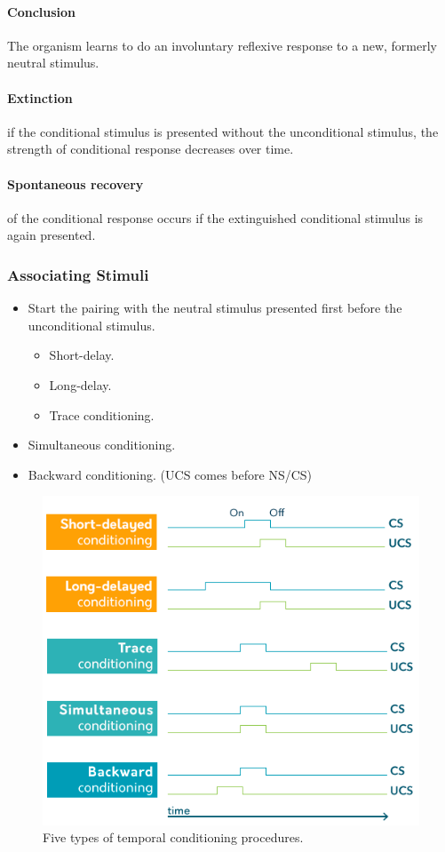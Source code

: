 \documentclass{article}
\begin{document}
	\paragraph{Conclusion} The organism learns to do an involuntary reflexive response to a new, formerly neutral stimulus.
	\paragraph{Extinction} if the conditional stimulus is presented without the unconditional stimulus, the strength of conditional response decreases over time.
	\paragraph{Spontaneous recovery} of the conditional response occurs if the extinguished conditional stimulus is again presented.
	\subsubsection{Associating Stimuli}
	\begin{itemize}
		\item Start the pairing with the neutral stimulus presented first before the unconditional stimulus.
		\begin{itemize}
			\item Short-delay.
			\item Long-delay.
			\item Trace conditioning.
		\end{itemize}
		\item Simultaneous conditioning.
		\item Backward conditioning. (UCS comes before NS/CS)
	\end{itemize}
	\begin{figure}
		\centering
		\includegraphics[width = \linewidth]{pic/conditioning_methods}
		\caption{Five types of temporal conditioning procedures.}
	\end{figure}
\end{document}
